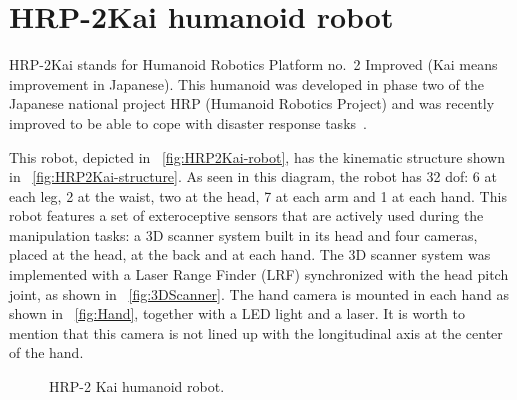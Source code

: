 \section{HRP-2Kai humanoid robot}
	\label{sec:hrp2kai}
	
	HRP-2Kai stands for Humanoid Robotics Platform no.~2 Improved (Kai means improvement in Japanese).
	This humanoid was developed in phase two of the Japanese national project HRP
	(Humanoid Robotics Project) and was recently improved to be able to cope with disaster response
	tasks~\cite{Kaneko}.
	
	This robot, depicted in \figurename~\ref{fig:HRP2Kai-robot}, has the kinematic structure shown
	in \figurename~\ref{fig:HRP2Kai-structure}.
	As seen in this diagram, the robot has 32 dof:
	6 at each leg, 2 at the waist, two at the head, 7 at each arm and 1 at each hand.
	This robot features a set of exteroceptive sensors that are actively used during the manipulation
	tasks: a 3D scanner system built in its head and four cameras, placed at the head, at the back and
	at each hand.
	The 3D scanner system was implemented with a Laser Range Finder (LRF) synchronized with the head
	pitch joint, as shown in \figurename~\ref{fig:3DScanner}.
	The hand camera is mounted in each hand as shown in \figurename~\ref{fig:Hand}, together with a
	LED light and a laser.
	It is worth to mention that this camera is not lined up with the longitudinal axis at the center
	of the hand.
	
	\begin{figure}[t]
		\begin{center}
			\hspace{1cm}
		\end{center}
		\caption{HRP-2 Kai humanoid robot.}
		\label{fig:HRP2Kai}
	\end{figure}
	
